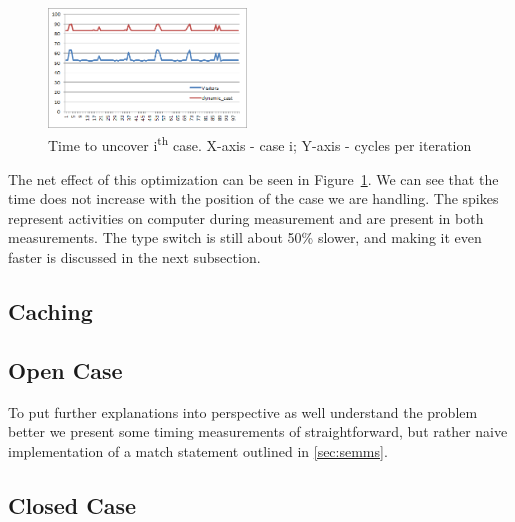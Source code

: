 \documentclass[preprint]{sigplanconf}
\begin{document}
\begin{figure}[htbp]
  \centering
    \includegraphics[width=0.47\textwidth]{DCast-vs-Visitors2.png}
  \caption{Time to uncover i\textsuperscript{th} case. X-axis - case i; Y-axis - cycles per iteration}
  \label{fig:DCastVis2}
\end{figure}

The net effect of this optimization can be seen in Figure~\ref{fig:DCastVis2}. 
We can see that the time does not increase with the position of the case we are 
handling. The spikes represent activities on computer during measurement and are 
present in both measurements. The type switch is still about 50\% slower, and 
making it even faster is discussed in the next subsection.

\subsection{Caching}

\subsection{Open Case}

To put further explanations into perspective as well understand the problem 
better we present some timing measurements of straightforward, but rather naive 
implementation of a match statement outlined in \textsection\ref{sec:semms}.

\subsection{Closed Case}


\end{document}

